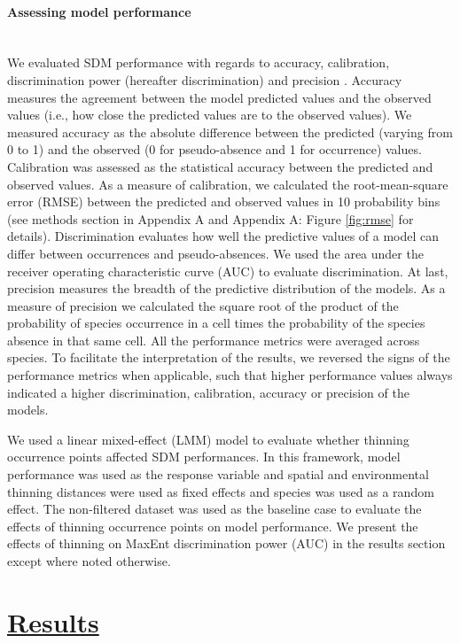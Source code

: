 \paragraph*{Assessing model performance}\mbox{}\\ 
We evaluated SDM performance with regards to accuracy, calibration, discrimination power (hereafter discrimination) and precision \parencite{norberg2019}. Accuracy measures the agreement between the model predicted values and the observed values (i.e., how close the predicted values are to the observed values). We measured accuracy as the absolute difference between the predicted (varying from 0 to 1) and the observed (0 for pseudo-absence and 1 for occurrence) values. Calibration was assessed as the statistical accuracy between the predicted and observed values. As a measure of calibration, we calculated the root-mean-square error (RMSE) between the predicted and observed values in 10 probability bins (see methods section in Appendix A and Appendix A: Figure \ref{fig:rmse} for details). Discrimination evaluates how well the predictive values of a model can differ between occurrences and pseudo-absences. We used the area under the receiver operating characteristic curve (AUC) \parencite{fielding1997} to evaluate discrimination. At last, precision measures the breadth of the predictive distribution of the models. As a measure of precision we calculated the square root of the product of the probability of species occurrence in a cell times the probability of the species absence in that same cell. All the performance metrics were averaged across species. To facilitate the interpretation of the results, we reversed the signs of the performance metrics when applicable, such that higher performance values always indicated a higher discrimination, calibration, accuracy or precision of the models.

We used a linear mixed-effect (LMM) model to evaluate whether thinning occurrence points affected SDM performances. In this framework, model performance was used as the response variable and spatial and environmental thinning distances were used as fixed effects and species was used as a random effect. The non-filtered dataset was used as the baseline case to evaluate the effects of thinning occurrence points on model performance. We present the effects of thinning on MaxEnt discrimination power (AUC) in the results section except where noted otherwise.



\section*{\textbf{\underline{Results}}}

